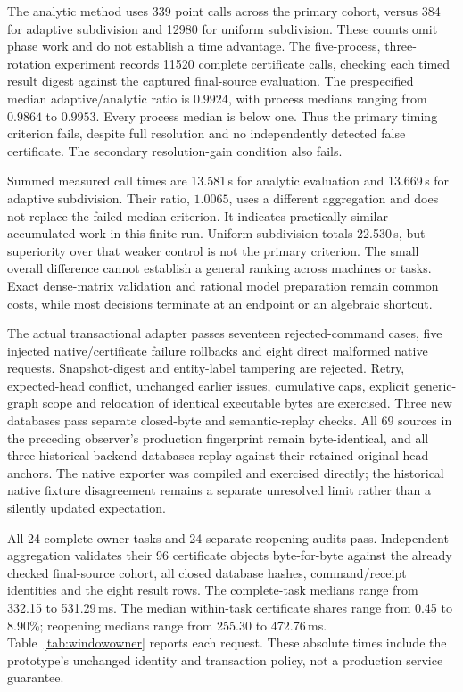 \documentclass[11pt,a4paper]{article}
\theoremstyle{definition}\newtheorem{definition}[theorem]{Definition}
\begin{document}
The analytic method uses 339 point calls across the primary cohort, versus 384 for adaptive subdivision and 12980 for uniform subdivision. These counts omit phase work and do not establish a time advantage. The five-process, three-rotation experiment records 11520 complete certificate calls, checking each timed result digest against the captured final-source evaluation. The prespecified median adaptive/analytic ratio is $0.9924$, with process medians ranging from $0.9864$ to $0.9953$. Every process median is below one. Thus the primary timing criterion fails, despite full resolution and no independently detected false certificate. The secondary resolution-gain condition also fails.


Summed measured call times are 13.581\,s for analytic evaluation and 13.669\,s for adaptive subdivision. Their ratio, $1.0065$, uses a different aggregation and does not replace the failed median criterion. It indicates practically similar accumulated work in this finite run. Uniform subdivision totals 22.530\,s, but superiority over that weaker control is not the primary criterion. The small overall difference cannot establish a general ranking across machines or tasks. Exact dense-matrix validation and rational model preparation remain common costs, while most decisions terminate at an endpoint or an algebraic shortcut.

The actual transactional adapter passes seventeen rejected-command cases, five injected native/certificate failure rollbacks and eight direct malformed native requests. Snapshot-digest and entity-label tampering are rejected. Retry, expected-head conflict, unchanged earlier issues, cumulative caps, explicit generic-graph scope and relocation of identical executable bytes are exercised. Three new databases pass separate closed-byte and semantic-replay checks. All 69 sources in the preceding observer's production fingerprint remain byte-identical, and all three historical backend databases replay against their retained original head anchors. The native exporter was compiled and exercised directly; the historical native fixture disagreement remains a separate unresolved limit rather than a silently updated expectation.

All 24 complete-owner tasks and 24 separate reopening audits pass. Independent aggregation validates their 96 certificate objects byte-for-byte against the already checked final-source cohort, all closed database hashes, command/receipt identities and the eight result rows. The complete-task medians range from 332.15 to 531.29\,ms. The median within-task certificate shares range from 0.45 to 8.90\%; reopening medians range from 255.30 to 472.76\,ms. Table~\ref{tab:windowowner} reports each request. These absolute times include the prototype's unchanged identity and transaction policy, not a production service guarantee.

\end{document}
